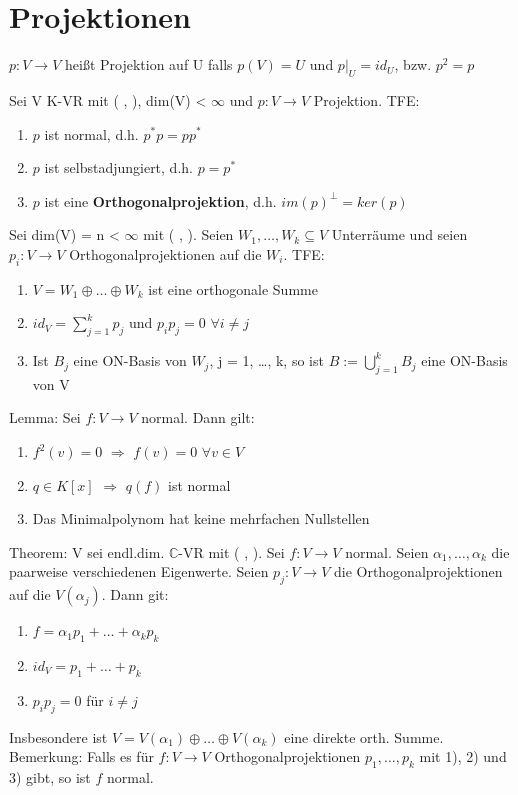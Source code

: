 \section{Projektionen}
$p: V \to V$ heißt Projektion auf U falls $p(V) = U$ und $p|_U = id_U$, bzw. $p^2 = p$
\begin{compactitem}
\item Sei V K-VR mit ( , ), dim(V) < $\infty$ und $p: V \to V$ Projektion. TFE:
\begin{enumerate}
\item $p$ ist normal, d.h. $p^*p = pp^*$
\item $p$ ist selbstadjungiert, d.h. $p = p^*$
\item $p$ ist eine \textbf{Orthogonalprojektion}, d.h. $im(p)^\perp = ker(p)$
\end{enumerate}
\item Sei dim(V) = n < $\infty$ mit ( , ). Seien $W_1, …, W_k \subseteq V$ Unterräume und seien $p_i: V \to V$ Orthogonalprojektionen auf die $W_i$. TFE:
\begin{enumerate}
\item $V = W_1 \oplus … \oplus W_k$ ist eine orthogonale Summe
\item $id_V = \sum\limits_{j=1}^k p_j$ und $p_ip_j = 0$ $\forall i \neq j$
\item Ist $B_j$ eine ON-Basis von $W_j$, j = 1, …, k, so ist $B := \bigcup\limits_{j=1}^k B_j$ eine ON-Basis von V 
\end{enumerate}
\item Lemma: Sei $f: V \to V$ normal. Dann gilt:
\begin{enumerate}
\item $f^2(v) = 0$ $\Rightarrow$ $f(v) = 0$ $\forall v \in V$
\item $q \in K[x]$ $\Rightarrow$ $q(f)$ ist normal
\item Das Minimalpolynom hat keine mehrfachen Nullstellen
\end{enumerate}
\item Theorem: V sei endl.dim. $\mathbb{C}$-VR mit ( , ). Sei $f: V \to V$ normal. Seien $\alpha_1, …, \alpha_k$ die paarweise verschiedenen Eigenwerte. Seien $p_j: V \to V$ die Orthogonalprojektionen auf die $V(\alpha_j)$. Dann git:
\begin{enumerate}
\item $f = \alpha_1p_1 + … + \alpha_kp_k$
\item $id_V = p_1 + … + p_k$
\item $p_ip_j = 0$ für $i \neq j$
\end{enumerate}
Insbesondere ist $V = V(\alpha_1) \oplus … \oplus V(\alpha_k)$ eine direkte orth. Summe.\\
Bemerkung: Falls es für $f: V \to V$ Orthogonalprojektionen $p_1, …, p_k$ mit 1), 2) und 3) gibt, so ist $f$ normal.
\end{compactitem}

